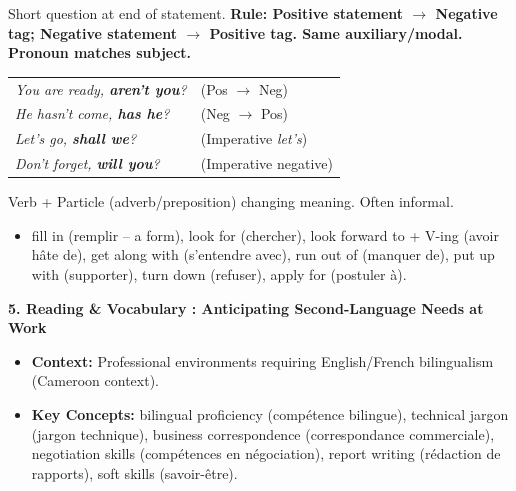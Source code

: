 \documentclass[11pt]{article}
\newcommand{\cle}[1]{{\popxbold\color{popdark}#1}}
\begin{document}
\begin{bilan}
\begin{definition}
Short question at end of statement. \textbf{Rule: Positive statement $\rightarrow$ Negative tag; Negative statement $\rightarrow$ Positive tag. Same auxiliary/modal. Pronoun matches subject.}
\begin{center}
\begin{tabular}{ll}
\emph{You are ready, \textbf{aren't you}?} & (Pos $\rightarrow$ Neg) \\
\emph{He hasn't come, \textbf{has he}?} & (Neg $\rightarrow$ Pos) \\
\emph{Let's go, \textbf{shall we}?} & (Imperative \emph{let's}) \\
\emph{Don't forget, \textbf{will you}?} & (Imperative negative)
\end{tabular}
\end{center}
\end{definition}

\begin{definition}
Verb + Particle (adverb/preposition) changing meaning. Often informal.
\begin{itemize}
  \item \cle{fill in} (remplir -- a form), \cle{look for} (chercher), \cle{look forward to + V-ing} (avoir hâte de), \cle{get along with} (s'entendre avec), \cle{run out of} (manquer de), \cle{put up with} (supporter), \cle{turn down} (refuser), \cle{apply for} (postuler à).
\end{itemize}
\end{definition}

\textbf{5. Reading \& Vocabulary : Anticipating Second-Language Needs at Work}
\begin{itemize}
  \item \textbf{Context:} Professional environments requiring English/French bilingualism (Cameroon context).
  \item \textbf{Key Concepts:} \cle{bilingual proficiency} (compétence bilingue), \cle{technical jargon} (jargon technique), \cle{business correspondence} (correspondance commerciale), \cle{negotiation skills} (compétences en négociation), \cle{report writing} (rédaction de rapports), \cle{soft skills} (savoir-être).
\end{itemize}


\end{bilan}
\end{document}
